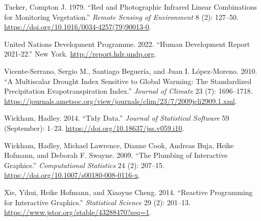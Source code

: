 \documentclass[
]{article}
\newlength{\cslhangindent}
\newlength{\cslentryspacingunit} %
\newenvironment{CSLReferences}[2] %
 {%
  \setlength{\parindent}{0pt}
  \ifodd #1
  \let\oldpar\par
  \def\par{\hangindent=\cslhangindent\oldpar}
  \fi
  \setlength{\parskip}{#2\cslentryspacingunit}
 }%
 {}
\begin{document}
\begin{CSLReferences}{1}{0}
\leavevmode{}%
Tucker, Compton J. 1979. {``Red and Photographic Infrared Linear
Combinations for Monitoring Vegetation.''} \emph{Remote Sensing of
Environment} 8 (2): 127--50.
\url{https://doi.org/10.1016/0034-4257(79)90013-0}.

\leavevmode{}%
United Nations Development Programme. 2022. {``Human Development Report
2021-22.''} New York. \url{http://report.hdr.undp.org}.

\leavevmode{}%
Vicente-Serrano, Sergio M., Santiago Beguería, and Juan I. López-Moreno.
2010. {``A {Multiscalar} {Drought} {Index} {Sensitive} to {Global}
{Warming}: {The} {Standardized} {Precipitation} {Evapotranspiration}
{Index}.''} \emph{Journal of Climate} 23 (7): 1696--1718.
\url{https://journals.ametsoc.org/view/journals/clim/23/7/2009jcli2909.1.xml}.

\leavevmode{}%
Wickham, Hadley. 2014. {``Tidy {Data}.''} \emph{Journal of Statistical
Software} 59 (September): 1--23.
\url{https://doi.org/10.18637/jss.v059.i10}.

\leavevmode{}%
Wickham, Hadley, Michael Lawrence, Dianne Cook, Andreas Buja, Heike
Hofmann, and Deborah F. Swayne. 2009. {``The Plumbing of Interactive
Graphics.''} \emph{Computational Statistics} 24 (2): 207--15.
\url{https://doi.org/10.1007/s00180-008-0116-x}.

\leavevmode{}%
Xie, Yihui, Heike Hofmann, and Xiaoyue Cheng. 2014. {``Reactive
{Programming} for {Interactive} {Graphics}.''} \emph{Statistical
Science} 29 (2): 201--13.
\url{https://www.jstor.org/stable/43288470?seq=1}.

\end{CSLReferences}
\end{document}
